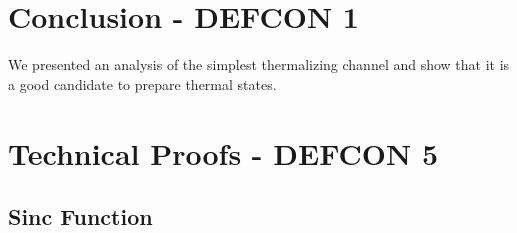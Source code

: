 \documentclass{article}
\begin{document}
\section{Conclusion - DEFCON 1} \label{sec:conclusion}

We presented an analysis of the simplest thermalizing channel and show that it is a good candidate to prepare thermal states.




\appendix 


\section{Technical Proofs - DEFCON 5} \label{sec:appendix}
\subsection{Sinc Function} \label{sec:appendix_sinc}
\end{document}

